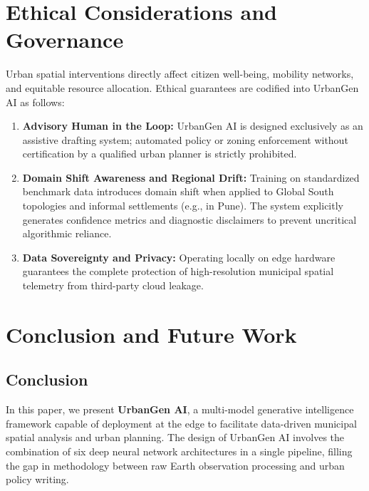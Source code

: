 \documentclass[conference]{IEEEtran}
\begin{document}
\section{Ethical Considerations and Governance}
Urban spatial interventions directly affect citizen well-being, mobility networks, and equitable resource allocation. Ethical guarantees are codified into UrbanGen AI as follows:
\begin{enumerate}
    \item \textbf{Advisory Human in the Loop:} UrbanGen AI is designed exclusively as an assistive drafting system; automated policy or zoning enforcement without certification by a qualified urban planner is strictly prohibited.
    \item \textbf{Domain Shift Awareness and Regional Drift:} Training on standardized benchmark data introduces domain shift when applied to Global South topologies and informal settlements (e.g., in Pune). The system explicitly generates confidence metrics and diagnostic disclaimers to prevent uncritical algorithmic reliance.
    \item \textbf{Data Sovereignty and Privacy:} Operating locally on edge hardware guarantees the complete protection of high-resolution municipal spatial telemetry from third-party cloud leakage.
\end{enumerate}

\FloatBarrier
\section{Conclusion and Future Work}
\subsection{Conclusion}
In this paper, we present \textbf{UrbanGen AI}, a multi-model generative intelligence framework capable of deployment at the edge to facilitate data-driven municipal spatial analysis and urban planning. The design of UrbanGen AI involves the combination of six deep neural network architectures in a single pipeline, filling the gap in methodology between raw Earth observation processing and urban policy writing.
\end{document}
